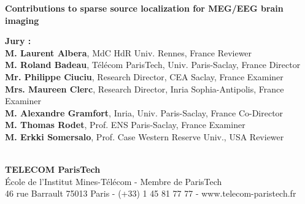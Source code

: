 \documentclass[12pt,a4paper,english]{MastersDoctoralThesis}
\begin{document}
\begin{center}
%
%
%
\vspace{1.cm}%
%
%
%
\begin{spacing}{3.0}
\textcolor[RGB]{191,18,56}{
\noindent
{\Huge{\bf Contributions to sparse source localization for MEG/EEG brain imaging}}\\
}
\end{spacing}
%
%
\vspace{2.cm}%
%
%
%
\end{center}
%
%
%
\vspace{-1.2cm}
%
%
%
\flushleft
\hspace{-1.7cm}
\begin{minipage}{1.05\textwidth}	%
{\bf Jury :}\vspace{0.2cm}\\
{\bf M. Laurent Albera}, {\small MdC HdR Univ. Rennes, France}
\hfill Reviewer\\
{\bf M. Roland Badeau}, {\small T\'el\'ecom ParisTech, Univ. Paris-Saclay, France}
\hfill Director\\
{\bf Mr. Philippe Ciuciu}, {\small Research Director, CEA Saclay, France}
\hfill Examiner\\
{\bf Mrs. Maureen Clerc}, {\small Research Director, Inria Sophia-Antipolis, France}
\hfill Examiner\\
{\bf M. Alexandre Gramfort}, {\small Inria, Univ. Paris-Saclay, France}
\hfill Co-Director\\
{\bf M. Thomas Rodet}, {\small Prof. ENS Paris-Saclay, France}
\hfill Examiner\\
{\bf M. Erkki Somersalo}, {\small Prof. Case Western Reserve Univ., USA}
\hfill Reviewer\\%
\end{minipage}\\
%
%
%
\vspace{.8cm}
%
%
%
\centering
{\bf TELECOM ParisTech}\\
{\small École de l'Institut Mines-Télécom - Membre de ParisTech}\\
{\tiny 46 rue Barrault 75013 Paris - (+33) 1 45 81 77 77 - www.telecom-paristech.fr}
%
%
%
\newpage
\end{document}
